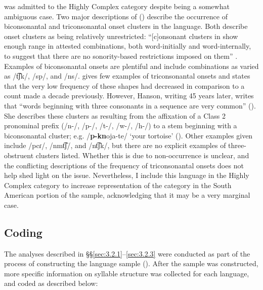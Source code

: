    was admitted to the Highly Complex category despite being a somewhat ambiguous case. Two major descriptions of  (\citealt{Hanson2010,Matteson1965}) describe the occurrence of biconsonantal and triconsonantal onset clusters in the language. Both describe onset clusters as being relatively unrestricted: “[c]onsonant clusters in  show enough range in attested combinations, both word-initially and word-internally, to suggest that there are no sonority-based restrictions imposed on them” \citep[27]{Hanson2010}. Examples of biconsonantal onsets are plentiful and include combinations as varied as /t͡ʃk/, /sp/, and /ns/. \citet[24]{Matteson1965} gives few examples of triconsonantal onsets and states that the very low frequency of these shapes had decreased in comparison to a count made a decade previously. However, Hanson, writing 45 years later, writes that “words beginning with three consonants in a sequence are very common” (\citeyear[27]{Hanson2010}). She describes these clusters as resulting from the affixation of a Class 2 pronominal prefix (/n-/, /p-/, /t-/, /w-/, /h-/) to a stem beginning with a biconsonantal cluster; e.g. /\textbf{p-kn}oja-te/ ‘your tortoise’ (\citeyear[26]{Hanson2010}). Other examples given include /pcɾ/, /nmt͡ʃ/, and /nt͡ʃk/, but there are no explicit examples of three-obstruent clusters listed. Whether this is due to non-occurrence is unclear, and the conflicting descriptions of the frequency of triconsonantal onsets does not help shed light on the issue. Nevertheless, I include this language in the Highly Complex category to increase representation of the category in the South American portion of the sample, acknowledging that it may be a very marginal case.

\subsection{Coding}\label{sec:3.2.4}

  The analyses described in §§\ref{sec:3.2.1}--\ref{sec:3.2.3} were conducted as part of the process of constructing the language sample (). After the sample was constructed, more specific information on syllable structure was collected for each language, and coded as described below:

